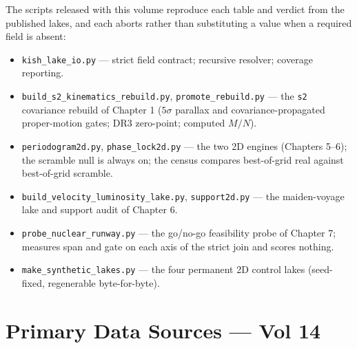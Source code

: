 \documentclass[11pt, letterpaper, openany]{book}
\begin{document}
\noindent The scripts released with this volume reproduce each table and verdict from the published
lakes, and each aborts rather than substituting a value when a required field is absent:

\begin{itemize}
    \item \texttt{kish\_lake\_io.py} --- strict field contract; recursive resolver; coverage reporting.
    \item \texttt{build\_s2\_kinematics\_rebuild.py}, \texttt{promote\_rebuild.py} --- the \texttt{s2}
          covariance rebuild of Chapter 1 ($5\sigma$ parallax and covariance-propagated proper-motion
          gates; DR3 zero-point; computed $M/N$).
    \item \texttt{periodogram2d.py}, \texttt{phase\_lock2d.py} --- the two 2D engines (Chapters 5--6);
          the scramble null is always on; the census compares best-of-grid real against
          best-of-grid scramble.
    \item \texttt{build\_velocity\_luminosity\_lake.py}, \texttt{support2d.py} --- the maiden-voyage
          lake and support audit of Chapter 6.
    \item \texttt{probe\_nuclear\_runway.py} --- the go/no-go feasibility probe of Chapter 7; measures
          span and gate on each axis of the strict join and scores nothing.
    \item \texttt{make\_synthetic\_lakes.py} --- the four permanent 2D control lakes (seed-fixed,
          regenerable byte-for-byte).
\end{itemize}

\section*{Primary Data Sources --- Vol 14}
\end{document}
